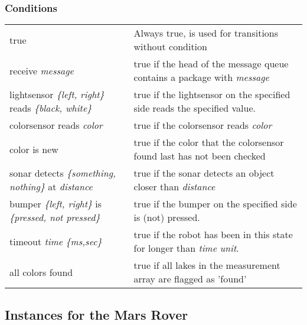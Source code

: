 \documentclass[11pt,a4paper]{article}
\begin{document}
\subsubsection{Conditions}
\begin{tabular}{p{6cm}p{10cm}}
true & Always true, is used for transitions without condition\\
receive \emph{message} & true if the head of the message queue contains a package with \emph{message}\\
lightsensor \emph{\{left, right\}} reads \emph{\{black, white\}} & true if the lightsensor on the specified side reads the specified value.\\
colorsensor reads \emph{color} & true if the colorsensor reads \emph{color}\\
color is new & true if the color that the colorsensor found last has not been checked\\
sonar detects \emph{\{something, nothing\}} at \emph{distance} & true if the sonar detects an object closer than \emph{distance}\\
bumper \emph{\{left, right\}} is \emph{\{pressed, not pressed\}} & true if the bumper on the specified side is (not) pressed.\\
timeout \emph{time} \emph{\{ms,sec\}} & true if the robot has been in this state for longer than \emph{time} \emph{unit}.\\
all colors found & true if all lakes in the measurement array are flagged as 'found'\\
\end{tabular}

\subsection*{Instances for the Mars Rover}
\end{document}
